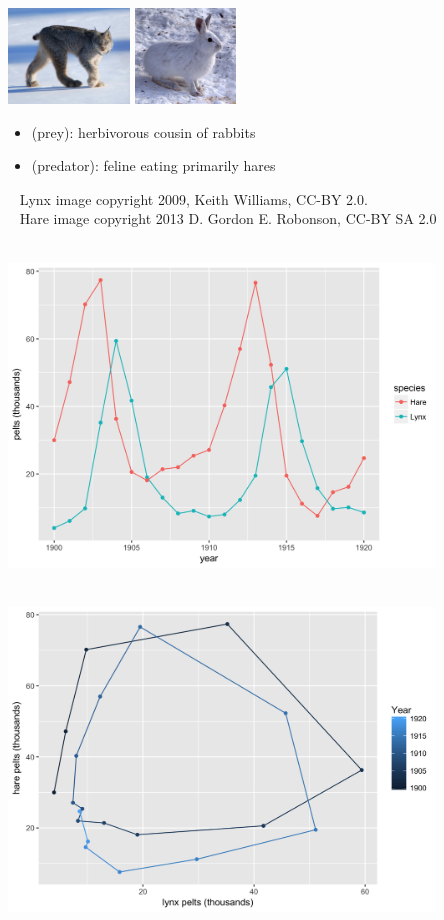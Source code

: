 \documentclass[10pt]{report}
\begin{document}
\begin{center}
\includegraphics[height=1in]{img/lynx.jpg}
\hspace*{0.25in}
\includegraphics[height=1in]{img/hare.jpg}
\end{center}
\begin{itemize}
\item {} (prey): herbivorous cousin of rabbits
\item {} (predator): feline eating primarily hares
\end{itemize}
\vfill
{\tiny
\mbox{ } \hfill
Lynx image copyright 2009, Keith Williams, CC-BY 2.0.
\\[-2pt]
\mbox{ } \hfill
Hare image copyright 2013 D. Gordon E. Robonson, CC-BY SA 2.0}


%
\\[-4pt] \spc
\includegraphics[width=0.85\textwidth]{img/hare-lynx-pelts-1.png}


%
\\[-4pt] \spc
\includegraphics[width=0.85\textwidth]{img/hare-lynx-pelts-2.png}
\end{document}
